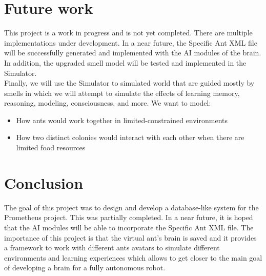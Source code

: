 \documentclass[titlepage, 12pt]{article}
\begin{document}
\section{Future work}

This project is a work in progress and is not yet completed. There are multiple implementations  under development. In a near future, the Specific Ant XML file will be successfully generated and implemented with the AI modules of the brain. In addition, the upgraded smell model will be tested and implemented in the Simulator. \\

Finally, we will use the Simulator to simulated world that are guided mostly by smells in which we will attempt to simulate the effects of learning memory, reasoning, modeling, consciousness, and more. We want to model: 
\begin{itemize}
\item How ants would work together in limited-constrained environments
\item How two distinct colonies would interact with each other when there are limited food resources
\end{itemize}

\section{Conclusion}
The goal of this project was to design and develop a database-like system for the Prometheus project. This was partially completed. In a near future, it is hoped that the AI modules will be able to incorporate the Specific Ant XML file. The importance of this project is that the virtual ant's brain is saved and it provides a framework to work with different ants avatars to simulate different environments and learning experiences which allows to get closer to the main goal of developing a brain for a fully autonomous robot. 

\newpage
\end{document}
